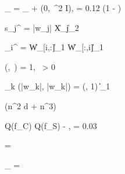 
_{} = _{} + (0,\, \sigma^2 I),
\qquad
\sigma = 0.12 \cdot \left(1 - \right)


s_j^{} = |w_j| \cdot \|X_j\|_2

\varphi_i^{} = \|W_{}[i,:]\|_1 \cdot \|W_{}[:,i]\|_1


\cos(\alpha {},\, ) = 1, \quad \forall\, \alpha > 0

\sum_{k} \min(|\alpha w_k|,\; |w_k|) = \min(\alpha, 1) \cdot \|\|_1


\!\left(n^2 \cdot d \;+\; n^3\right) \quad {}


Q(f_C) \geq Q(f_S) - \varepsilon, \quad \varepsilon = 0.03


 = 


_{} = 



